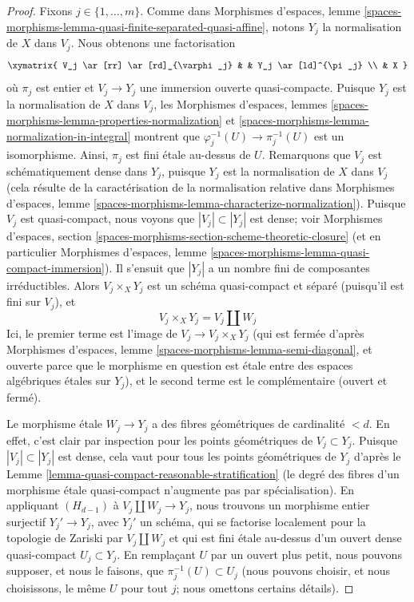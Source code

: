 \begin{proof}
\medskip\noindent
Fixons $j \in \{1, \ldots, m\}$.
Comme dans Morphismes d'espaces, lemme
\ref{spaces-morphisms-lemma-quasi-finite-separated-quasi-affine},
notons $Y_j$ la normalisation de $X$ dans $V_j$. Nous obtenons une
factorisation
$$
\xymatrix{
V_j \ar[rr] \ar[rd]_{\varphi_j} & & Y_j \ar[ld]^{\pi_j} \\
& X
}
$$
où $\pi_j$ est entier et $V_j \to Y_j$ une immersion ouverte
quasi-compacte. Puisque $Y_j$ est la normalisation de $X$ dans $V_j$, les
Morphismes d'espaces, lemmes
\ref{spaces-morphisms-lemma-properties-normalization} et
\ref{spaces-morphisms-lemma-normalization-in-integral}
montrent que $\varphi_j^{-1}(U) \to \pi_j^{-1}(U)$ est un isomorphisme.
Ainsi, $\pi_j$ est fini étale au-dessus de $U$. Remarquons que $V_j$ est
schématiquement dense dans $Y_j$, puisque $Y_j$ est la normalisation de $X$
dans $V_j$ (cela résulte de la caractérisation de la normalisation relative
dans Morphismes d'espaces, lemme
\ref{spaces-morphisms-lemma-characterize-normalization}). Puisque $V_j$ est
quasi-compact, nous voyons que $|V_j| \subset |Y_j|$ est dense; voir
Morphismes d'espaces, section
\ref{spaces-morphisms-section-scheme-theoretic-closure}
(et en particulier Morphismes d'espaces, lemme
\ref{spaces-morphisms-lemma-quasi-compact-immersion}).
Il s'ensuit que $|Y_j|$ a un nombre fini de composantes irréductibles.
Alors $V_j \times_X Y_j$ est un schéma quasi-compact et séparé
(puisqu'il est fini sur $V_j$), et
$$
V_j \times_X Y_j = V_j \amalg W_j
$$
Ici, le premier terme est l'image de $V_j \to V_j \times_X Y_j$
(qui est fermée d'après
Morphismes d'espaces, lemme \ref{spaces-morphisms-lemma-semi-diagonal},
et ouverte parce que le morphisme en question est étale entre des espaces
algébriques étales sur $Y_j$), et le second terme est le complémentaire
(ouvert et fermé).

\medskip\noindent
Le morphisme étale $W_j \to Y_j$ a des fibres géométriques de cardinalité
$< d$. En effet, c'est clair par inspection pour les points géométriques de
$V_j \subset Y_j$. Puisque $|V_j| \subset |Y_j|$ est dense, cela vaut pour
tous les points géométriques de $Y_j$ d'après le
Lemme \ref{lemma-quasi-compact-reasonable-stratification}
(le degré des fibres d'un morphisme étale quasi-compact n'augmente pas par
spécialisation). En appliquant $(H_{d - 1})$ à
$V_j \amalg W_j \to Y_j$, nous trouvons un morphisme entier surjectif
$Y_j' \to Y_j$, avec $Y_j'$ un schéma, qui se factorise localement pour la
topologie de Zariski par $V_j \amalg W_j$ et qui est fini étale au-dessus
d'un ouvert dense quasi-compact $U_j \subset Y_j$. En remplaçant $U$ par un
ouvert plus petit, nous pouvons supposer, et nous le faisons, que
$\pi_j^{-1}(U) \subset U_j$ (nous pouvons choisir, et nous choisissons, le
même $U$ pour tout $j$; nous omettons certains détails).


\end{proof}

